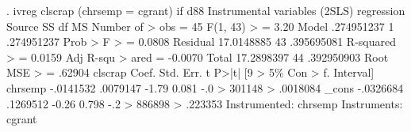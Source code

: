 . ivreg clscrap (chrsemp = cgrant) if d88
{\smallskip}
Instrumental variables (2SLS) regression
{\smallskip}
      Source {\VBAR}       SS           df       MS      Number of
>  obs   =        45
   F(1, 43) 
>        =      3.20
       Model {\VBAR}  .274951237         1  .274951237   Prob > F 
>        =    0.0808
    Residual {\VBAR}  17.0148885        43  .395695081   R-squared
>        =    0.0159
   Adj R-squ
> ared   =   -0.0070
       Total {\VBAR}  17.2898397        44  .392950903   Root MSE 
>        =    .62904
{\smallskip}
     clscrap {\VBAR}      Coef.   Std. Err.      t    P>|t|     [9
> 5\% Con                                                    
>       f. Interval]
     chrsemp {\VBAR}  -.0141532   .0079147    -1.79   0.081    -.0
> 301148                                                    
>           .0018084
       _cons {\VBAR}  -.0326684   .1269512    -0.26   0.798    -.2
> 886898                                                    
>            .223353
Instrumented:  chrsemp
Instruments:   cgrant
{\smallskip}
